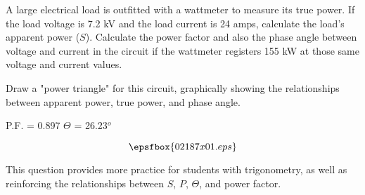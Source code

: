 

A large electrical load is outfitted with a wattmeter to measure its true power.  If the load voltage is 7.2 kV and the load current is 24 amps, calculate the load's apparent power ($S$).  Calculate the power factor and also the phase angle between voltage and current in the circuit if the wattmeter registers 155 kW at those same voltage and current values.

Draw a "power triangle" for this circuit, graphically showing the relationships between apparent power, true power, and phase angle.







P.F. = 0.897 \hskip 20pt $\Theta$ = 26.23$^{o}$

$$\epsfbox{02187x01.eps}$$







This question provides more practice for students with trigonometry, as well as reinforcing the relationships between $S$, $P$, $\Theta$, and power factor.




